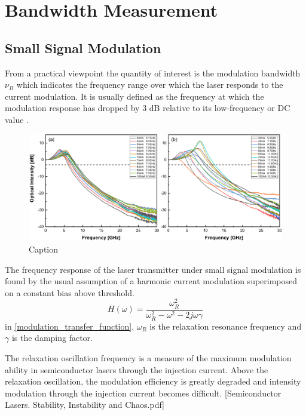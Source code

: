 \section{Bandwidth Measurement}\label{sec:bandwidth_measurement}
\subsection{Small Signal Modulation}
From a practical viewpoint the quantity of interest is the modulation bandwidth $\nu_B$ which indicates the frequency range over which the laser responds to the current modulation. It is usually defined as the frequency at which the modulation response has dropped by 3 dB relative to its low-frequency or DC value \cite{agrawal2013semiconductor}.
\begin{figure}[ht]
    \centering
    \includegraphics[width=15cm]{figures/bandwidth_gain_scan_cleaved_and_lensed_grating_4679.png}
    \caption{Caption}
    \label{fig:bandwidth_gain_scan_cleaved_and_lensed}
\end{figure}

The frequency response of the laser transmitter under small signal modulation is found by the usual assumption of a harmonic current modulation superimposed on a constant bias above threshold.
\begin{equation}
    H(\omega)=\frac{\omega_R^2}{\omega_R^2-\omega^2-2j\omega\gamma}
    \label{modulation_transfer_function}
\end{equation}
in \autoref{modulation_transfer_function}, $\omega_R$ is the relaxation resonance frequency and $\gamma$ is the damping factor.

The relaxation oscillation frequency is a measure of the maximum modulation ability in semiconductor lasers through the injection current. Above the relaxation oscillation, the modulation efficiency is greatly degraded and intensity modulation through the injection current becomes difficult. [Semiconductor Lasers. Stability, Instability and Chaos.pdf]

